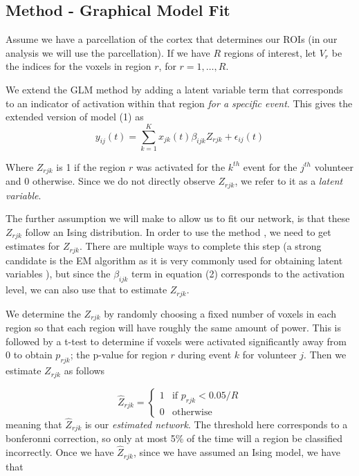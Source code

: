 \documentclass[12pt]{article}
\begin{document}
\subsection{Method - Graphical Model Fit}
Assume we have a parcellation of the cortex that determines our ROIs (in our analysis we will use the \cite{gordon2016generation} parcellation).  If we have $R$ regions of interest, let $V_r$ be the indices for the voxels in region $r$, for $r = 1, \dots, R$.

We extend the GLM method by adding a latent variable term that corresponds to an indicator of activation within that region \emph{for a specific event}.  This gives the extended version of model (1) as
\begin{equation}y_{ij}(t) = \sum_{k = 1}^K x_{jk}(t)\beta_{ijk}Z_{rjk} + \epsilon_{ij}(t)\end{equation}

Where $Z_{rjk}$ is 1 if the region $r$ was activated for the $k^{th}$ event for the $j^{th}$ volunteer and 0 otherwise.  Since we do not directly observe $Z_{rjk}$, we refer to it as a \emph{latent variable}. 

The further assumption we will make to allow us to fit our network, is that these $Z_{rjk}$ follow an Ising distribution.  In order to use the method \cite{ravikumar2010high}, we need to get estimates for $Z_{rjk}$.  There are multiple ways to complete this step (a strong candidate is the EM algorithm as it is very commonly used for obtaining latent variables \cite{dempster1977maximum}), but since the $\beta_{ijk}$ term in equation (2) corresponds to the activation level, we can also use that to estimate $Z_{rjk}$.  




We determine the $Z_{rjk}$ by randomly choosing a fixed number of voxels in each region so that each region will have roughly the same amount of power.  This is followed by a t-test to determine if voxels were activated significantly away from 0 to obtain $p_{rjk}$; the p-value for region $r$ during event $k$ for volunteer $j$.  Then we estimate $Z_{rjk}$ as follows

\begin{equation}\hat{Z}_{rjk} = \begin{cases} 1 &\text{if }p_{rjk} < 0.05/R \\ 0 &\text{otherwise} \end{cases}\end{equation}
meaning that $\hat{Z}_{rjk}$ is our \emph{estimated network}.  The threshold here corresponds to a bonferonni correction, so only at most 5\% of the time will a region be classified incorrectly. 
%
%
%
%
Once we have $\hat{Z}_{rjk}$, since we have assumed an Ising model, we have that 
\end{document}
